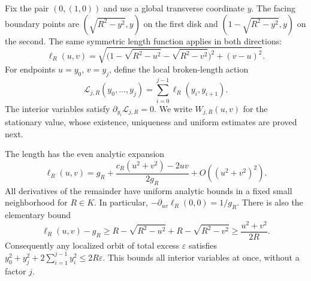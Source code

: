 Fix the pair $(0,(1,0))$ and use a global transverse coordinate $y$.
The facing boundary points are
$(\sqrt{R^2-y^2},y)$ on the first disk and
$(1-\sqrt{R^2-y^2},y)$ on the second. The same symmetric length function
applies in both directions:
\begin{equation}\label{eq:ell}
 \ell_R(u,v)=
 \sqrt{\bigl(1-\sqrt{R^2-u^2}-\sqrt{R^2-v^2}\bigr)^2+(v-u)^2}.
\end{equation}
For endpoints $u=y_0$, $v=y_j$, define the local broken-length action
\begin{equation}\label{eq:action}
 \mathcal L_{j,R}(y_0,\ldots,y_j)=\sum_{i=0}^{j-1}\ell_R(y_i,y_{i+1}).
\end{equation}
The interior variables satisfy $\partial_{y_i}\mathcal L_{j,R}=0$.
We write $W_{j,R}(u,v)$ for the stationary value, whose existence,
uniqueness and uniform estimates are proved next.

The length has the even analytic expansion
\begin{equation}\label{eq:one-quadratic}
 \ell_R(u,v)=g_R+
 \frac{c_R(u^2+v^2)-2uv}{2g_R}+O((u^2+v^2)^2).
\end{equation}
All derivatives of the remainder have uniform analytic bounds in a
fixed small neighborhood for $R\in K$. In particular,
$-\partial_{uv}\ell_R(0,0)=1/g_R$. There is also the elementary bound
\begin{equation}\label{eq:energy-coercive}
 \ell_R(u,v)-g_R\ge
 R-\sqrt{R^2-u^2}+R-\sqrt{R^2-v^2}
 \ge\frac{u^2+v^2}{2R}.
\end{equation}
Consequently any localized orbit of total excess $\varepsilon$ satisfies
$y_0^2+y_j^2+2\sum_{i=1}^{j-1}y_i^2\le2R\varepsilon$.
This bounds all interior variables at once, without a factor $j$.
